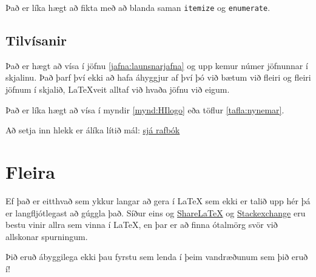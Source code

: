 \documentclass[a4paper, 12pt]{article}
\begin{document}
Það er líka hægt að fikta með að blanda saman \verb|itemize| og \verb|enumerate|. 

\subsection{Tilvísanir}
Það er hægt að vísa í jöfnu \ref{jafna:launsnarjafna} og upp kemur númer jöfnunnar í skjalinu. Það þarf því ekki að hafa áhyggjur af því þó við bætum við fleiri og fleiri jöfnum í skjalið, \LaTeX veit alltaf við hvaða jöfnu við eigum.

Það er líka hægt að vísa í myndir \ref{mynd:HIlogo} eða töflur \ref{tafla:nynemar}.

Að setja inn hlekk er álíka lítið mál: \href{http://edbook.hi.is/undirbuningur_stae/}{sjá rafbók}

\section*{Fleira}
Ef það er eitthvað sem ykkur langar að gera í \LaTeX{} sem ekki er talið upp hér þá er langfljótlegast að gúggla það. Síður eins og \href{https://www.sharelatex.com/learn}{ShareLaTeX} og \href{https://tex.stackexchange.com}{Stackexchange} eru bestu vinir allra sem vinna í \LaTeX{}, en þar er að finna ótalmörg svör við allskonar spurningum.

Þið eruð ábyggilega ekki þau fyrstu sem lenda í þeim vandræðunum sem þið eruð í!
\end{document}

